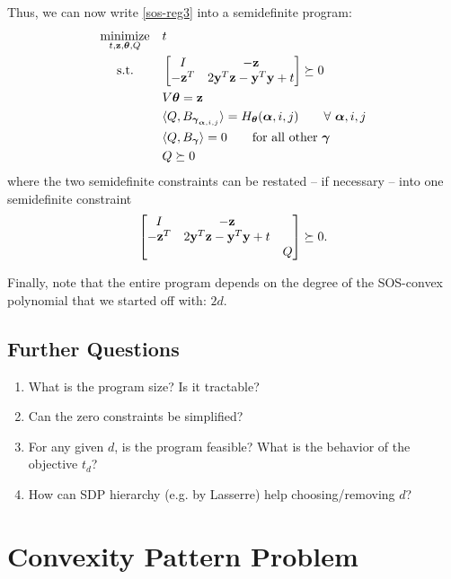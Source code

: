 \documentclass[11pt]{article}
\begin{document}
Thus, we can now write \eqref{sos-reg3} into a semidefinite program:
\begin{equation}\label{sos-reg4}
\begin{aligned}
& \underset{t, {\bf z}, {\boldsymbol\theta}, Q}{\text{minimize}}
& & t \\
& \text{\quad\ s.t.}
& & \begin{bmatrix} I & -{\bf z} \\ -{\bf z}^T & 2{\bf y}^T{\bf z} - {\bf y}^T{\bf y} + t \end{bmatrix} \succeq 0 \\
& & & V{\boldsymbol\theta} = {\bf z} \\
& & & \langle{Q, B_{{\boldsymbol\gamma}_{{\boldsymbol\alpha}, i, j}}\rangle} = H_{\boldsymbol\theta}({\boldsymbol\alpha}, i, j) \qquad \forall\ {\boldsymbol\alpha}, i, j \\
& & & \langle{Q, B_{{\boldsymbol\gamma}}\rangle} = 0 \qquad \text{for all other ${\boldsymbol\gamma}$} \\
& & & Q \succeq 0 
\end{aligned}
\end{equation}
where the two semidefinite constraints can be restated -- if necessary -- into one semidefinite constraint
\[
\begin{bmatrix} I & -{\bf z} &  \\ -{\bf z}^T & 2{\bf y}^T{\bf z} - {\bf y}^T{\bf y} + t & \\ & & Q \end{bmatrix} \succeq 0.
\]

Finally, note that the entire program depends on the degree of the SOS-convex polynomial that we started off with: $2d$. 

\subsection*{Further Questions}

\begin{enumerate}
\item What is the program size? Is it tractable?
\item Can the zero constraints be simplified?
\item For any given $d$, is the program feasible? What is the behavior of the objective $t_d$?
\item How can SDP hierarchy (e.g. by Lasserre) help choosing/removing $d$?
\end{enumerate}

\clearpage
\section{Convexity Pattern Problem}
\end{document}
